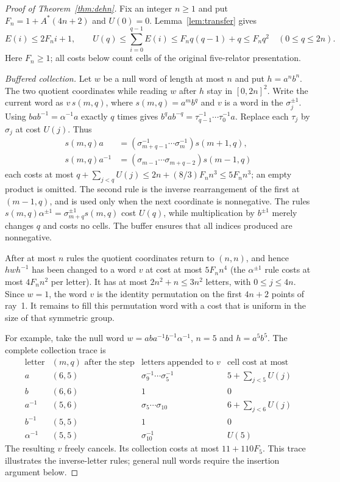 \documentclass[11pt,a4paper]{article}
\theoremstyle{plain}
\theoremstyle{definition}
\theoremstyle{remark}
\begin{document}
\begin{proof}[Proof of Theorem~\ref{thm:dehn}]
Fix an integer $n\ge1$ and put $F_n=1+A^*(4n+2)$ and $U(0)=0$. Lemma~\ref{lem:transfer} gives
\[
E(i)\le2F_ni+1,\qquad
U(q)\le\sum_{i=0}^{q-1}E(i)\le F_nq(q-1)+q\le F_nq^2
\quad(0\le q\le2n).
\]
Here $F_n\ge1$; all costs below count cells of the original five-relator presentation.

\emph{Buffered collection.} Let $w$ be a null word of length at most $n$ and put $h=a^nb^n$.
The two quotient coordinates while reading $w$ after $h$ stay in $[0,2n]^2$. Write the current word as
$v\,s(m,q)$, where $s(m,q)=a^mb^q$ and $v$ is a word in the $\sigma_j^{\pm1}$.
Using $bab^{-1}=\alpha^{-1}a$ exactly $q$ times gives
$b^qab^{-q}=\tau_{q-1}^{-1}\cdots\tau_0^{-1}a$.
Replace each $\tau_j$ by $\sigma_j$ at cost $U(j)$. Thus
\[
\begin{split}
s(m,q)a&=(\sigma_{m+q-1}^{-1}\cdots\sigma_m^{-1})s(m+1,q),\\
s(m,q)a^{-1}&=(\sigma_{m-1}\cdots\sigma_{m+q-2})s(m-1,q)
\end{split}
\]
each costs at most $q+\sum_{j<q}U(j)\le2n+(8/3)F_nn^3\le5F_nn^3$; an empty product is omitted.
The second rule is the inverse rearrangement of the first at $(m-1,q)$, and is used only when the next coordinate is nonnegative.
The rules $s(m,q)\alpha^{\pm1}=\sigma_{m+q}^{\pm1}s(m,q)$ cost $U(q)$, while multiplication by $b^{\pm1}$ merely changes $q$ and costs no cells.
The buffer ensures that all indices produced are nonnegative.

After at most $n$ rules the quotient coordinates return to $(n,n)$, and hence $hwh^{-1}$ has been changed to a word $v$
at cost at most $5F_nn^4$ (the $\alpha^{\pm1}$ rule costs at most $4F_nn^2$ per letter).
It has at most $2n^2+n\le3n^2$ letters, with $0\le j\le4n$.
Since $w=1$, the word $v$ is the identity permutation on the first $4n+2$ points of ray~1. It remains to fill this permutation word
with a cost that is uniform in the size of that symmetric group.

For example, take the null word $w=ab a^{-1}b^{-1}\alpha^{-1}$, $n=5$ and $h=a^5b^5$.
The complete collection trace is
\[
\begin{array}{c|c|l|l}
\text{letter}&(m,q)\text{ after the step}&\text{letters appended to }v&\text{cell cost at most}\\\hline
a&(6,5)&\sigma_9^{-1}\cdots\sigma_5^{-1}&5+\sum_{j<5}U(j)\\
b&(6,6)&1&0\\
a^{-1}&(5,6)&\sigma_5\cdots\sigma_{10}&6+\sum_{j<6}U(j)\\
b^{-1}&(5,5)&1&0\\
\alpha^{-1}&(5,5)&\sigma_{10}^{-1}&U(5)
\end{array}
\]
The resulting $v$ freely cancels. Its collection costs at most $11+110F_5$.
This trace illustrates the inverse-letter rules; general null words require the insertion argument below.


\end{proof}
\end{document}
